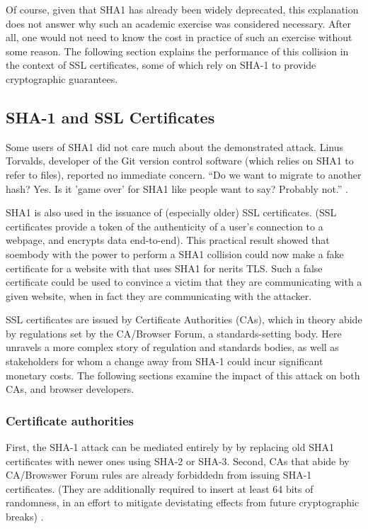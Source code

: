 \documentclass[sigconf]{acmart}
\begin{document}
Of course, given that SHA1 has already been widely deprecated, this explanation does not answer why such an academic exercise was considered necessary.
After all, one would not need to know the cost in practice of such an exercise without some reason.
The following section explains the performance of this collision in the context of SSL certificates, some of which rely on SHA-1 to provide cryptographic guarantees.

\subsection{SHA-1 and SSL Certificates}
\label{sec:orgab24957}

Some users of SHA1 did not care much about the demonstrated attack.
Linus Torvalds, developer of the Git version control software (which relies on SHA1 to refer to files), reported no immediate concern.
``Do we want to migrate to another hash? Yes. Is it 'game over' for SHA1 like people want to say? Probably not.'' \cite{Torvalds2017}.

SHA1 is also used in the issuance of (especially older) SSL certificates.
(SSL certificates
provide a token of the authenticity of a user's connection to a webpage,
and encrypts data end-to-end).
This practical result showed that soembody with the power to perform a SHA1 collision could
now make a fake certificate for a website with that uses SHA1 for nerits TLS.
Such a false certificate could
be used to convince a victim that they are communicating with a given website,
when in fact they are communicating with the attacker.

SSL certificates are issued by Certificate Authorities (CAs), which in theory abide by 
regulations set by the CA/Browser Forum, a standards-setting body.
Here unravels a more complex story of regulation and standards bodies,
as well as stakeholders for whom a change away from SHA-1 could incur significant monetary costs.
The following sections examine the impact of this attack on both CAs, and browser developers. 

\subsubsection{Certificate authorities}
\label{sec:org6bed1ed}

First, the SHA-1 attack can be mediated entirely by
by replacing old SHA1 certificates with newer ones using SHA-2 or SHA-3.
Second, CAs that abide by CA/Browswer Forum rules are already forbiddedn from issuing SHA-1 certificates. (They are additionally required to insert at least 64 bits of randomness, in an effort to mitigate devistating effects from future cryptographic breaks) \cite{Stevens2017}.
\end{document}
